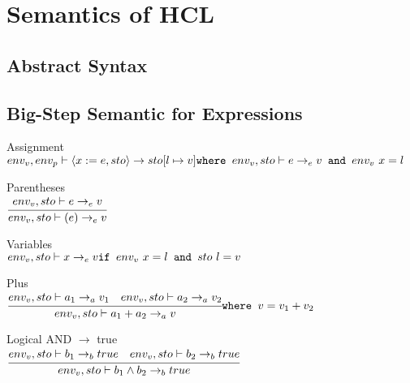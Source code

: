 
\section{Semantics of HCL}

\subsection{Abstract Syntax}

\subsection{Big-Step Semantic for Expressions}
Assignment\\
\begin{math}
	env_v, env_p \vdash \langle x := e, sto \rangle \rightarrow sto[l \mapsto v]\\
	\texttt{where } env_v, sto \vdash e \rightarrow_e v
	\texttt{ and } env_v \ x = l
\end{math}

Parentheses\\
\begin{math}
	\cfrac{env_v, sto \vdash e \rightarrow_e v}
	{env_v, sto \vdash (e) \rightarrow_e v}
\end{math}

Variables\\
\begin{math}
	env_v, sto \vdash x \rightarrow_e v\\
	\texttt{if } env_v \ x = l
	\texttt{ and } sto \ l = v
\end{math}

Plus\\
\begin{math}
	\cfrac{env_v, sto \vdash a_1 \rightarrow_a v_1 \quad env_v, sto \vdash a_2 \rightarrow_a v_2}
	{env_v, sto \vdash a_1 + a_2 \rightarrow_a v}\\
	\texttt{where } v = v_1 + v_2
\end{math}

Logical AND $\rightarrow$ true\\
\begin{math}
	\cfrac{env_v, sto \vdash b_1 \rightarrow_b true \quad env_v, sto \vdash b_2 \rightarrow_b true}
	{env_v, sto \vdash b_1 \wedge b_2 \rightarrow_b true}
\end{math}

